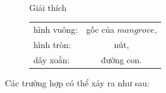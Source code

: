 \documentclass[../main.tex]{subfiles}
\begin{document}
\begin{figure}[H]
    \centering
    \\
    Giải thích \\

    \flushleft

    \begin{tabular}{lc}
      hình vuông: & gốc của \(mangrove\),\\ 
      hình tròn: & nút, \\
      dây xoắn: & đường con.      
    \end{tabular}
\end{figure}

Các trường hợp có thể xảy ra như sau:
\end{document}
